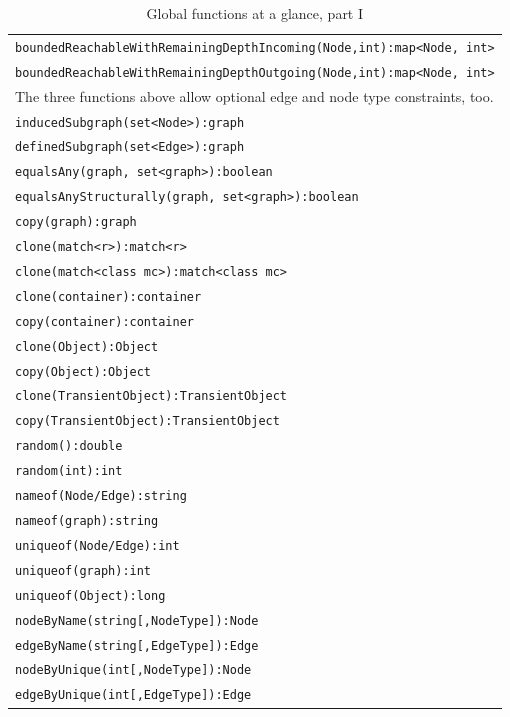 \begin{table}[htbp]
\begin{tabular}{|l|}
\texttt{boundedReachableWithRemainingDepthIncoming(Node,int):map<Node, int>}\\
\texttt{boundedReachableWithRemainingDepthOutgoing(Node,int):map<Node, int>}\\
The three functions above allow optional edge and node type constraints, too.\\
\hline
\texttt{inducedSubgraph(set<Node>):graph}\\
\texttt{definedSubgraph(set<Edge>):graph}\\
\texttt{equalsAny(graph, set<graph>):boolean}\\
\texttt{equalsAnyStructurally(graph, set<graph>):boolean}\\
\texttt{copy(graph):graph}\\
\texttt{clone(match<r>):match<r>}\\
\texttt{clone(match<class mc>):match<class mc>}\\
\texttt{clone(container):container}\\
\texttt{copy(container):container}\\
\texttt{clone(Object):Object}\\
\texttt{copy(Object):Object}\\
\texttt{clone(TransientObject):TransientObject}\\
\texttt{copy(TransientObject):TransientObject}\\
\hline
\texttt{random():double}\\
\texttt{random(int):int}\\
\hline
\texttt{nameof(Node/Edge):string}\\
\texttt{nameof(graph):string}\\
\texttt{uniqueof(Node/Edge):int}\\
\texttt{uniqueof(graph):int}\\
\texttt{uniqueof(Object):long}\\
\texttt{nodeByName(string[,NodeType]):Node}\\
\texttt{edgeByName(string[,EdgeType]):Edge}\\
\texttt{nodeByUnique(int[,NodeType]):Node}\\
\texttt{edgeByUnique(int[,EdgeType]):Edge}\\
\hline
\end{tabular}
\caption{Global functions at a glance, part I}
\label{funcstab}
\end{table}


